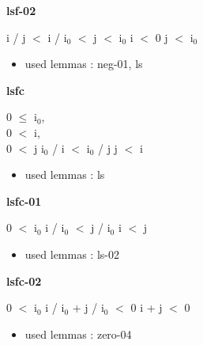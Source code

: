 \documentclass[a4paper]{article}
\begin{document}
\bigskip

{\large\bf lsf-02}

\medskip

 \Fol i / j $<$ i / $\mbox{i}_{0}$  $<$ j  $<$ $\mbox{i}_{0}$ \And i $<$ 0 \Imp j $<$ $\mbox{i}_{0}$

\begin{itemize}


\item       used lemmas  : neg-01, ls

\end{itemize}

\medskip

\bigskip

{\large\bf lsfc}

\medskip

0 $\le$ $\mbox{i}_{0}$, \\
0 $<$ i, \\
0 $<$ j \Fol $\mbox{i}_{0}$ / i $<$ $\mbox{i}_{0}$ / j \Imp j $<$ i

\begin{itemize}


\item       used lemmas  : ls

\end{itemize}

\medskip

\bigskip

{\large\bf lsfc-01}

\medskip

0 $<$ $\mbox{i}_{0}$ \Fol i / $\mbox{i}_{0}$ $<$ j / $\mbox{i}_{0}$ \Imp i $<$ j

\begin{itemize}


\item       used lemmas  : ls-02

\end{itemize}

\medskip

\bigskip

{\large\bf lsfc-02}

\medskip

0 $<$ $\mbox{i}_{0}$ \Fol i / $\mbox{i}_{0}$ + j / $\mbox{i}_{0}$ $<$ 0 \Imp i + j $<$ 0

\begin{itemize}


\item       used lemmas  : zero-04

\end{itemize}
\end{document}
